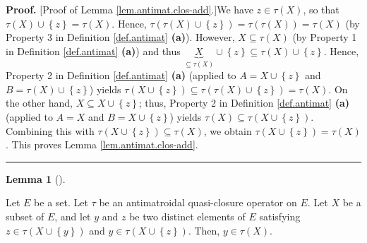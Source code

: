 \documentclass[numbers=enddot,12pt,final,onecolumn]{scrartcl}%
\theoremstyle{definition}
\newtheorem{lem}[theo]{Lemma}
\newenvironment{lemma}[1][]
{\begin{lem}[#1]\begin{leftbar}}
{\end{leftbar}\end{lem}}
\newenvironment{proof}[1][Proof]{\noindent\textbf{#1.} }{\ \rule{0.5em}{0.5em}}
\newenvironment{verlong}{}{}
\begin{document}
\begin{verlong}


\begin{proof}
[Proof of Lemma \ref{lem.antimat.clos-add}.]We have $z\in\tau\left(  X\right)
$, so that $\tau\left(  X\right)  \cup\left\{  z\right\}  =\tau\left(
X\right)  $. Hence, $\tau\left(  \tau\left(  X\right)  \cup\left\{  z\right\}
\right)  =\tau\left(  \tau\left(  X\right)  \right)  =\tau\left(  X\right)  $
(by Property 3 in Definition \ref{def.antimat} \textbf{(a)}). However,
$X\subseteq\tau\left(  X\right)  $ (by Property 1 in Definition
\ref{def.antimat} \textbf{(a)}) and thus $\underbrace{X}_{\subseteq\tau\left(
X\right)  }\cup\left\{  z\right\}  \subseteq\tau\left(  X\right)  \cup\left\{
z\right\}  $. Hence, Property 2 in Definition \ref{def.antimat} \textbf{(a)}
(applied to $A=X\cup\left\{  z\right\}  $ and $B=\tau\left(  X\right)
\cup\left\{  z\right\}  $) yields $\tau\left(  X\cup\left\{  z\right\}
\right)  \subseteq\tau\left(  \tau\left(  X\right)  \cup\left\{  z\right\}
\right)  =\tau\left(  X\right)  $. On the other hand, $X\subseteq
X\cup\left\{  z\right\}  $; thus, Property 2 in Definition \ref{def.antimat}
\textbf{(a)} (applied to $A=X$ and $B=X\cup\left\{  z\right\}  $) yields
$\tau\left(  X\right)  \subseteq\tau\left(  X\cup\left\{  z\right\}  \right)
$. Combining this with $\tau\left(  X\cup\left\{  z\right\}  \right)
\subseteq\tau\left(  X\right)  $, we obtain $\tau\left(  X\cup\left\{
z\right\}  \right)  =\tau\left(  X\right)  $. This proves Lemma
\ref{lem.antimat.clos-add}.
\end{proof}
\end{verlong}

\begin{lemma}
\label{lem.antimat.nicer}Let $E$ be a set. Let $\tau$ be an antimatroidal
quasi-closure operator on $E$. Let $X$ be a subset of $E$, and let $y$ and $z$
be two distinct elements of $E$ satisfying $z\in\tau\left(  X\cup\left\{
y\right\}  \right)  $ and $y\in\tau\left(  X\cup\left\{  z\right\}  \right)
$. Then, $y\in\tau\left(  X\right)  $.
\end{lemma}
\end{document}

